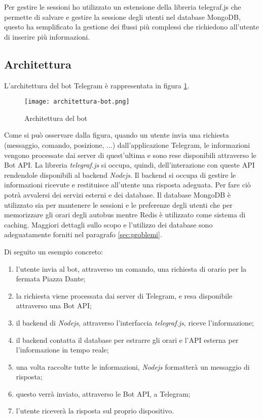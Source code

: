 Per gestire le sessioni ho utilizzato un estensione della libreria telegraf.js che permette di salvare e gestire la sessione degli utenti nel database MongoDB, questo ha semplificato la gestione dei flussi più complessi che richiedono all'utente di inserire più informazioni. 

\subsection{Architettura}
\label{sec:architettura}

L'architettura del bot Telegram è rappresentata in figura \ref{fig:architettura_bot}.

\begin{figure}[h]
\centering
\texttt{[image: architettura-bot.png]}
\caption{Architettura del bot}
\label{fig:architettura_bot}
\end{figure}

Come si può osservare dalla figura, quando un utente invia una richiesta (messaggio, comando, posizione, ...) dall'applicazione Telegram, le informazioni vengono processate dai server di quest'ultima e sono rese disponibili attraverso le Bot API. La libreria \textit{telegraf.js} si occupa, quindi, dell'interazione con queste API rendendole disponibili al backend \textit{Nodejs}. Il backend si occupa di gestire le informazioni ricevute e restituisce all'utente una risposta adeguata. Per fare ciò potrà avvalersi dei servizi esterni e dei database. Il database MongoDB è utilizzato sia per mantenere le sessioni e le preferenze degli utenti che per memorizzare gli orari degli autobus mentre Redis è utilizzato come sistema di caching. Maggiori dettagli sullo scopo e l'utilizzo dei database sono adeguatamente forniti nel paragrafo \ref{sec:problemi}.

\pagebreak

\noindent Di seguito un esempio concreto: 
\begin{enumerate} 
\item l'utente invia al bot, attraverso un comando, una richiesta di orario per la fermata Piazza Dante; 
\item la richiesta viene processata dai server di Telegram, e resa disponibile attraverso una Bot API;
\item il backend di \textit{Nodejs}, attraverso l'interfaccia \textit{telegraf.js}, riceve l'informazione;
\item il backend contatta il database per estrarre gli orari e l'API esterna per l'informazione in tempo reale;
\item una volta raccolte tutte le informazioni, \textit{Nodejs} formatterà un messaggio di risposta; 
\item questo verrà inviato, attraverso le Bot API, a Telegram; 
\item l'utente riceverà la risposta sul proprio dispositivo. 
\end{enumerate}

